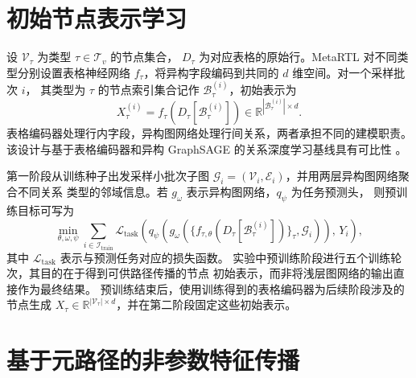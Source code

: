 
\section{初始节点表示学习}
\label{sec:metartl-pretrain}

设 $\mathcal V_\tau$ 为类型 $\tau\in\mathcal T_v$ 的节点集合，
$D_\tau$ 为对应表格的原始行。MetaRTL 对不同类型分别设置表格神经网络
$f_\tau$，将异构字段编码到共同的 $d$ 维空间。对一个采样批次 $i$，
其类型为 $\tau$ 的节点索引集合记作 $\mathcal B_{\tau}^{(i)}$，初始表示为
\begin{equation}
  X_{\tau}^{(i)}
  = f_\tau\!\left(D_\tau[\mathcal B_{\tau}^{(i)}]\right)
  \in \mathbb R^{|\mathcal B_{\tau}^{(i)}|\times d}.
  \label{eq:metartl-tnn}
\end{equation}
表格编码器处理行内字段，异构图网络处理行间关系，两者承担不同的建模职责。
该设计与基于表格编码器和异构 GraphSAGE 的关系深度学习基线具有可比性
\cite{fey2024rdl,hamilton2017graphsage}。

第一阶段从训练种子出发采样小批次子图
$\mathcal G_i=(\mathcal V_i,\mathcal E_i)$，并用两层异构图网络聚合不同关系
类型的邻域信息。若 $g_{\omega}$ 表示异构图网络，$q_{\psi}$ 为任务预测头，
则预训练目标可写为
\begin{equation}
  \min_{\theta,\omega,\psi}
  \sum_{i\in\mathcal I_{\mathrm{train}}}
  \mathcal L_{\mathrm{task}}\!\left(
    q_\psi\!\left(g_\omega(
      \{f_{\tau,\theta}(D_\tau[\mathcal B_\tau^{(i)}])\}_{\tau},
      \mathcal G_i)\right),\,Y_i
  \right),
  \label{eq:metartl-pretrain}
\end{equation}
其中 $\mathcal L_{\mathrm{task}}$ 表示与预测任务对应的损失函数。
实验中预训练阶段进行五个训练轮次，其目的在于得到可供路径传播的节点
初始表示，而非将浅层图网络的输出直接作为最终结果。
预训练结束后，使用训练得到的表格编码器为后续阶段涉及的节点生成
$X_\tau\in\mathbb R^{|\mathcal V_\tau|\times d}$，并在第二阶段固定这些初始表示。

\section{基于元路径的非参数特征传播}
\label{sec:metartl-metapath}

